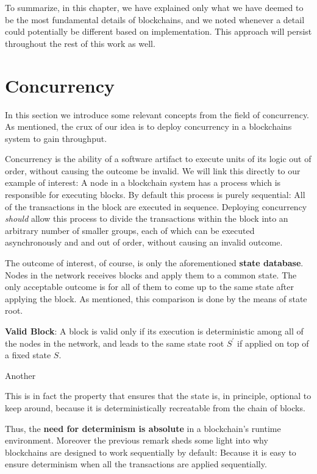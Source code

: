 To summarize, in this chapter, we have explained only what we have deemed to be the most fundamental
details of blockchains, and we noted whenever a detail could potentially be different based on
implementation. This approach will persist throughout the rest of this work as well.

\section{Concurrency} \label{chap_bg:sec:concurrency}

In this section we introduce some relevant concepts from the field of concurrency. As mentioned, the
crux of our idea is to deploy concurrency in a blockchains system to gain throughput.

Concurrency is the ability of a software artifact to execute units of its logic out of order,
without causing the outcome be invalid. We will link this directly to our example of interest: A
node in a blockchain system has a process which is responsible for executing blocks. By default
this process is purely sequential: All of the transactions in the block are executed in sequence.
Deploying concurrency \textit{should} allow this process to divide the transactions within the
block into an arbitrary number of smaller groups, each of which can be executed asynchronously and
and out of order, without causing an invalid outcome.

The outcome of interest, of course, is only the aforementioned \textbf{state database}. Nodes in the
network receives blocks and apply them to a common state. The only acceptable outcome is for all of
them to come up to the same state after applying the block. As mentioned, this comparison is done by
the means of state root.

\begin{definition} \textbf{Valid Block}:
	A block is valid only if its execution is deterministic among all of the nodes in the network,
	and leads to the same state root $S^{'}$ if applied on top of a fixed state $S$.

	Another
\end{definition}

This is in fact the property that ensures that the state is, in principle, optional to keep
around, because it is deterministically recreatable from the chain of blocks.

Thus, the \textbf{need for determinism is absolute} in a blockchain's runtime environment. Moreover the
previous remark sheds some light into why blockchains are designed to work sequentially by default:
Because it is easy to ensure determinism when all the transactions are applied sequentially.

